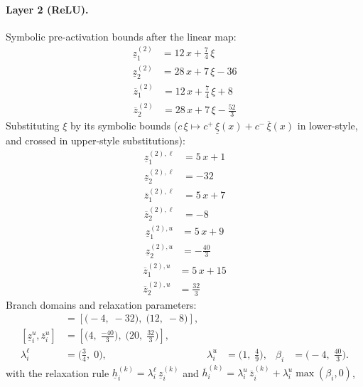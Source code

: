 \documentclass[11pt]{article}
\begin{document}
\paragraph{Layer 2 (ReLU).}
Symbolic pre-activation bounds after the linear map:
\begin{align*}
\underline{z}^{(2)}_{1} &= 12\,x + \frac{7}{4}\,\xi \\
\underline{z}^{(2)}_{2} &= 28\,x + 7\,\xi - 36
\end{align*}
\begin{align*}
\overline{z}^{(2)}_{1} &= 12\,x + \frac{7}{4}\,\xi + 8 \\
\overline{z}^{(2)}_{2} &= 28\,x + 7\,\xi - \frac{52}{3}
\end{align*}
Substituting $\xi$ by its symbolic bounds ($c\,\xi \mapsto c^{+}\,\underline{\xi}(x) + c^{-}\,\overline{\xi}(x)$ in lower-style, and crossed in upper-style substitutions):
\begin{align*}
\underline{z}^{(2),\ell}_{1} &= 5\,x + 1 \\
\underline{z}^{(2),\ell}_{2} &= -32
\end{align*}
\begin{align*}
\overline{z}^{(2),\ell}_{1} &= 5\,x + 7 \\
\overline{z}^{(2),\ell}_{2} &= -8
\end{align*}
\begin{align*}
\underline{z}^{(2),u}_{1} &= 5\,x + 9 \\
\underline{z}^{(2),u}_{2} &= -\frac{40}{3}
\end{align*}
\begin{align*}
\overline{z}^{(2),u}_{1} &= 5\,x + 15 \\
\overline{z}^{(2),u}_{2} &= \frac{32}{3}
\end{align*}
Branch domains and relaxation parameters:
\begin{align*}
[\underline{z}^{\ell}_i, \overline{z}^{\ell}_i] &= [\bigl(-4,\; -32\bigr),\; \bigl(12,\; -8\bigr)], \\ 
[\underline{z}^{u}_i, \overline{z}^{u}_i] &= [\bigl(4,\; \frac{-40}{3}\bigr),\; \bigl(20,\; \frac{32}{3}\bigr)], \\
\lambda^{\ell}_i &= \bigl(\frac{3}{4},\; 0\bigr), & \lambda^{u}_i &= \bigl(1,\; \frac{4}{9}\bigr), & \beta_i &= \bigl(-4,\; \frac{40}{3}\bigr).
\end{align*}
with the relaxation rule
$\underline{h}^{(k)}_i = \lambda^{\ell}_i\, \underline{z}^{(k)}_i$ and
$\overline{h}^{(k)}_i = \lambda^{u}_i\, \overline{z}^{(k)}_i + \lambda^{u}_i \max(\beta_i, 0)$,
\end{document}
